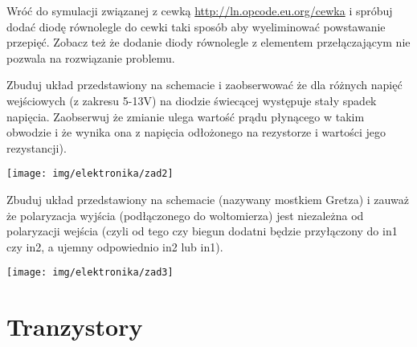 \documentclass{pdfBooklets}
\begin{document}
\begin{Zadanie}{}{}
Wróć do symulacji związanej z cewką \url{http://ln.opcode.eu.org/cewka} i spróbuj dodać diodę równolegle do cewki taki sposób aby wyeliminować powstawanie przepięć.
Zobacz też że dodanie diody równolegle z elementem przełączającym nie pozwala na rozwiązanie problemu.
\end{Zadanie}

\begin{Zadanie}{}{}
\noindent\begin{minipage}[b]{0.7\textwidth}
Zbuduj układ przedstawiony na schemacie i zaobserwować że dla różnych napięć wejściowych (z zakresu 5-13V) na diodzie świecącej występuje stały spadek napięcia.
Zaobserwuj że zmianie ulega wartość prądu płynącego w takim obwodzie i że wynika ona z napięcia odłożonego na rezystorze i wartości jego rezystancji).
\end{minipage}
\hfill
\begin{minipage}[b]{0.25\textwidth}
\texttt{[image: img/elektronika/zad2]}\vspace{0.5cm}
\end{minipage}
\end{Zadanie}

\begin{Zadanie}{}{}
\noindent\begin{minipage}[b]{0.6\textwidth}
Zbuduj układ przedstawiony na schemacie (nazywany mostkiem Gretza) i zauważ że polaryzacja wyjścia (podłączonego do woltomierza) jest niezależna od polaryzacji wejścia (czyli od tego czy biegun dodatni będzie przyłączony do in1 czy in2, a ujemny odpowiednio in2 lub in1).
\end{minipage}
\hfill
\begin{minipage}[b]{0.35\textwidth}
\texttt{[image: img/elektronika/zad3]}
\end{minipage}
\end{Zadanie}

\section{Tranzystory}
\end{document}
